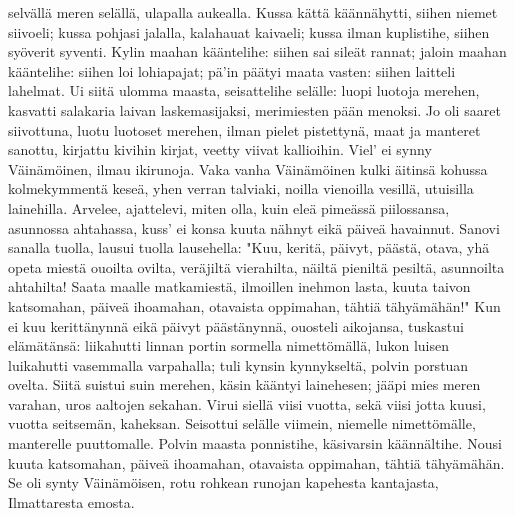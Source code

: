   \beginverse
    selvällä meren selällä,
    ulapalla aukealla.
    Kussa kättä käännähytti,
    siihen niemet siivoeli;
    kussa pohjasi jalalla,
    kalahauat kaivaeli;
    kussa ilman kuplistihe,
    siihen syöverit syventi.
  \endverse
  \beginverse
    Kylin maahan kääntelihe:
    siihen sai sileät rannat;
  \endverse
  \beginverse
    jaloin maahan kääntelihe:
    siihen loi lohiapajat;
    pä'in päätyi maata vasten:
    siihen laitteli lahelmat.
    Ui siitä ulomma maasta,
    seisattelihe selälle:
    luopi luotoja merehen,
    kasvatti salakaria
    laivan laskemasijaksi,
    merimiesten pään menoksi.
  \endverse
  \beginverse
    Jo oli saaret siivottuna,
    luotu luotoset merehen,
    ilman pielet pistettynä,
    maat ja manteret sanottu,
    kirjattu kivihin kirjat,
    veetty viivat kallioihin.
    Viel' ei synny Väinämöinen,
    ilmau ikirunoja.
    Vaka vanha Väinämöinen
    kulki äitinsä kohussa
  \endverse
  \beginverse
    kolmekymmentä keseä,
    yhen verran talviaki,
    noilla vienoilla vesillä,
    utuisilla lainehilla.
    Arvelee, ajattelevi,
    miten olla, kuin eleä
    pimeässä piilossansa,
    asunnossa ahtahassa,
    kuss' ei konsa kuuta nähnyt
    eikä päiveä havainnut.
  \endverse
  \beginverse
    Sanovi sanalla tuolla,
    lausui tuolla lausehella:
    "Kuu, keritä, päivyt, päästä,
    otava, yhä opeta
    miestä ouoilta ovilta,
    veräjiltä vierahilta,
    näiltä pieniltä pesiltä,
    asunnoilta ahtahilta!
    Saata maalle matkamiestä,
    ilmoillen inehmon lasta,
    kuuta taivon katsomahan,
    päiveä ihoamahan,
    otavaista oppimahan,
    tähtiä tähyämähän!"
    Kun ei kuu kerittänynnä
    eikä päivyt päästänynnä,
    ouosteli aikojansa,
    tuskastui elämätänsä:
    liikahutti linnan portin
    sormella nimettömällä,
  \endverse
  \beginverse
    lukon luisen luikahutti
    vasemmalla varpahalla;
    tuli kynsin kynnykseltä,
    polvin porstuan ovelta.
    Siitä suistui suin merehen,
    käsin kääntyi lainehesen;
    jääpi mies meren varahan,
    uros aaltojen sekahan.
  \endverse
  \beginverse
    Virui siellä viisi vuotta,
    sekä viisi jotta kuusi,
  \endverse
  \beginverse
    vuotta seitsemän, kaheksan.
    Seisottui selälle viimein,
    niemelle nimettömälle,
    manterelle puuttomalle.
    Polvin maasta ponnistihe,
    käsivarsin käännältihe.
    Nousi kuuta katsomahan,
    päiveä ihoamahan,
    otavaista oppimahan,
    tähtiä tähyämähän.
  \endverse
  \beginverse
    Se oli synty Väinämöisen,
    rotu rohkean runojan
    kapehesta kantajasta,
    Ilmattaresta emosta.
  \endverse
\endsong



